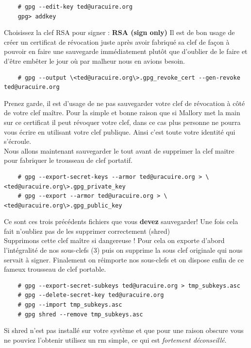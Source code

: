 \documentclass[a4paper]{article}
\begin{document}
\begin{verbatim}
    # gpg --edit-key ted@uracuire.org
    gpg> addkey
\end{verbatim}
Choisissez la clef RSA pour signer : \textbf{RSA (sign only)}
\newpage
Il est de bon usage de créer un certificat de révocation juste après avoir
fabriqué sa clef de façon à pouvoir en faire une sauvegarde immédiatement
plutôt que d'oublier de le faire et d'être embêter le jour où par malheur nous
en avions besoin.

\begin{verbatim}
    # gpg --output \<ted@uracuire.org\>.gpg_revoke_cert --gen-revoke ted@uracuire.org
\end{verbatim}
Prenez garde, il est d'usage de ne pas sauvegarder votre clef de révocation à
côté de votre clef maître. Pour la simple et bonne raison que si Mallory met la
main sur ce certificat il peut révoquer votre clef, dans ce cas plus personne
ne pourra vous écrire en utilisant votre clef publique. Ainsi c'est toute votre
identité qui s'écroule.
\\
Nous allons maintenant sauvegarder le tout avant de supprimer la clef maitre
pour fabriquer le trousseau de clef portatif.

\begin{verbatim}
    # gpg --export-secret-keys --armor ted@uracuire.org > \<ted@uracuire.org\>.gpg_private_key
    # gpg --export --armor ted@uracuire.org > \<ted@uracuire.org\>.gpg_public_key
\end{verbatim}

Ce sont ces trois précédents fichiers que vous \textbf{devez} sauvegarder!
Une fois cela fait n'oubliez pas de les supprimer correctement (shred)
\\
Supprimons cette clef maître si dangereuse ! Pour cela on exporte d'abord
l'intégralité de nos sous-clefs (3) puis on supprime la sous clef originale qui
nous servait à signer. Finalement on réimporte nos sous-clefs et on dispose
enfin de ce fameux trousseau de clef portable.

\begin{verbatim}
    # gpg --export-secret-subkeys ted@uracuire.org > tmp_subkeys.asc
    # gpg --delete-secret-key ted@uracuire.org
    # gpg --import tmp_subkeys.asc
    # gpg shred --remove tmp_subkeys.asc
\end{verbatim}
Si shred n'est pas installé sur votre système et que pour une raison obscure
vous ne pouviez l'obtenir utilisez un rm simple, ce qui est \emph{fortement
déconseillé}.
\end{document}
